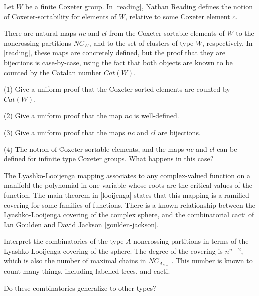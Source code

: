 \documentclass[12pt,letterpaper, reqno]{amsart}
\begin{document}
\begin{problemblock}
Let $W$ be a finite Coxeter group. In [reading], Nathan Reading defines the notion of Coxeter-sortability for elements of $W$, relative to some Coxeter element $c$.

There are natural maps $nc$ and $cl$ from the Coxeter-sortable elements of $W$ to the noncrossing partitions $NC_W$, and to the set of clusters of type $W$, respectively. In [reading], these maps are concretely defined, but the proof that they are bijections is case-by-case, using the fact that both objects are known to be counted by the Catalan number $Cat(W)$.


\begin{problem}[3.2]

(1) Give a uniform proof that the Coxeter-sorted elements are counted by $Cat(W)$.

(2) Give a uniform proof that the map $nc$ is well-defined.

(3) Give a uniform proof that the maps $nc$ and $cl$ are bijections.

(4) The notion of Coxeter-sortable elements, and the maps $nc$ and $cl$ can be defined for infinite type Coxeter groups. What happens in this case?

\end{problem}

\end{problemblock}

\begin{problemblock}

The Lyashko-Looijenga mapping associates to any complex-valued function on a manifold the polynomial in one variable whose roots are the critical values of the function. The main theorem in [looijenga] states that this mapping is a ramified covering for some families of functions. There is a known relationship between the Lyashko-Looijenga covering of the complex sphere, and the combinatorial cacti of Ian Goulden and David Jackson [goulden-jackson].

Interpret the combinatorics of the type $A$ noncrossing partitions in terms of the Lyashko-Looijenga covering of the sphere. The degree of the covering is $n^{n-2}$, which is also the number of maximal chains in $NC_{A_{n-1}}$. This number is known to count many things, including labelled trees, and cacti.


\begin{problem}[3.3]
Do these combinatorics generalize to other types?
\end{problem}

\end{problemblock}
\end{document}
